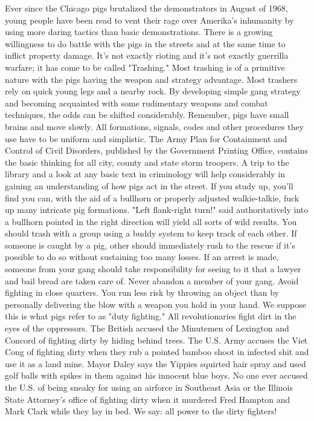 \documentclass[11pt,twoside,a4paper]{book}
\begin{document}
Ever since the Chicago pigs brutalized the demonstrators in August of 1968, young people have been read to vent their rage over Amerika's inhumanity by using more daring tactics than basic demonstrations. There is a growing willingness to do battle with the pigs in the streets and at the same time to inflict property damage. It's not exactly rioting and it's not exactly guerrilla warfare; it has come to be called "Trashing." Most trashing is of a primitive nature with the pigs having the weapon and strategy advantage. Most trashers rely on quick young legs and a nearby rock. By developing simple gang strategy and becoming acquainted with some rudimentary weapons and combat techniques, the odds can be shifted considerably. Remember, pigs have small brains and move slowly. All formations, signals, codes and other procedures they use have to be uniform and simplistic. The Army Plan for Containment and Control of Civil Disorders, published by the Government Printing Office, contains the basic thinking for all city, county and state storm troopers. A trip to the library and a look at any basic text in criminology will help considerably in gaining an understanding of how pigs act in the street. If you study up, you'll find you can, with the aid of a bullhorn or properly adjusted walkie-talkie, fuck up many intricate pig formations. "Left flank-right turn!" said authoritatively into a bullhorn pointed in the right direction will yield all sorts of wild results. You should trash with a group using a buddy system to keep track of each other. If someone is caught by a pig, other should immediately rush to the rescue if it's possible to do so without sustaining too many losses. If an arrest is made, someone from your gang should take responsibility for seeing to it that a lawyer and bail bread are taken care of. Never abandon a member of your gang. Avoid fighting in close quarters. You run less risk by throwing an object than by personally delivering the blow with a weapon you hold in your hand. We suppose this is what pigs refer to as "duty fighting." All revolutionaries fight dirt in the eyes of the oppressors. The British accused the Minutemen of Lexington and Concord of fighting dirty by hiding behind trees. The U.S. Army accuses the Viet Cong of fighting dirty when they rub a pointed bamboo shoot in infected shit and use it as a land mine. Mayor Daley says the Yippies squirted hair spray and used golf balls with spikes in them against his innocent blue boys. No one ever accused the U.S. of being sneaky for using an airforce in Southeast Asia or the Illinois State Attorney's office of fighting dirty when it murdered Fred Hampton and Mark Clark while they lay in bed. We say: all power to the dirty fighters! 
\end{document}

